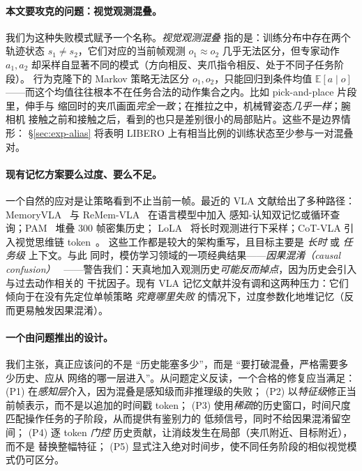 \documentclass[11pt]{ctexart}
\begin{document}
\paragraph{本文要攻克的问题：视觉观测混叠。}
我们为这种失败模式赋予一个名称。\emph{视觉观测混叠} 指的是：训练分布中存在两个轨迹状态
$s_1 \neq s_2$，它们对应的当前帧观测 $o_1 \approx o_2$ 几乎无法区分，但专家动作
$a_1, a_2$ 却采样自显著不同的模式（方向相反、夹爪指令相反、处于不同子任务阶段）。
行为克隆下的 Markov 策略无法区分 $o_1, o_2$，只能回归到条件均值 $\mathbb{E}[a\mid o]$
——而这个均值往往根本不在任务合法的动作集合之内。比如 pick-and-place 片段里，伸手与
缩回时的夹爪画面\emph{完全一致}；在推拉之中，机械臂姿态\emph{几乎一样}；腕相机
接触之前和接触之后，看到的也只是差别很小的局部贴片。这些不是边界情形：
\S\ref{sec:exp-alias} 将表明 LIBERO 上有相当比例的训练状态至少参与一对混叠对。

\paragraph{现有记忆方案要么过度、要么不足。}
一个自然的应对是让策略看到不止当前一帧。最近的 VLA 文献给出了多种路径：
MemoryVLA~\cite{shi2025memoryvla} 与 ReMem-VLA~\cite{remem2025} 在语言模型中加入
感知-认知双记忆或循环查询；PAM~\cite{pam2025} 堆叠 300 帧密集历史；
LoLA~\cite{lola2025} 将长时观测进行下采样；CoT-VLA 引入视觉思维链 token~\cite{zhao2025cotvla}。
这些工作都是较大的架构重写，且目标主要是 \emph{长时} 或 \emph{任务级} 上下文。与此
同时，模仿学习领域的一项经典结果——\emph{因果混淆（causal confusion）}~\cite{dehaan2019causal}
——警告我们：天真地加入观测历史\emph{可能反而掉点}，因为历史会引入与过去动作相关的
干扰因子。现有 VLA 记忆文献并没有调和这两种压力：它们倾向于在没有先定位单帧策略
\emph{究竟哪里失败} 的情况下，过度参数化地堆记忆（反而更易触发因果混淆）。

\paragraph{一个由问题推出的设计。}
我们主张，真正应该问的不是 “历史能塞多少”，而是 “要打破混叠，严格需要多少历史、应从
网络的哪一层进入”。从问题定义反读，一个合格的修复应当满足：
(P1) 在\emph{感知层}介入，因为混叠是感知级而非推理级的失败；
(P2) 以\emph{特征级}修正当前帧表示，而不是以追加的时间戳 token；
(P3) 使用\emph{稀疏}的历史窗口，时间尺度匹配操作任务的子阶段，从而提供有鉴别力的
低频信号，同时不给因果混淆留空间；
(P4) 逐 token \emph{门控} 历史贡献，让消歧发生在局部（夹爪附近、目标附近），而不是
替换整幅特征；
(P5) 显式注入绝对时间步，使不同任务阶段的相似视觉模式仍可区分。
\end{document}
